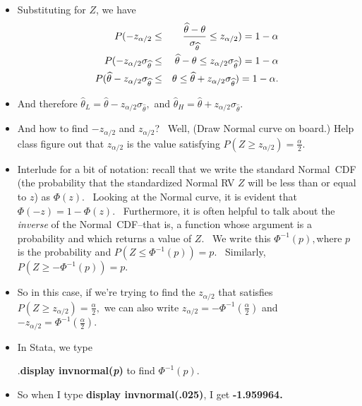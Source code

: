 \documentclass[11pt]{article}
\begin{document}
\begin{itemize}
\item Substituting for $Z$, we have%
\begin{eqnarray*}
P(-z_{\alpha /2} &\leq &\frac{\widehat{\theta }-\theta }{\sigma _{\widehat{%
\theta }}}\leq z_{\alpha /2})=1-\alpha \\
P(-z_{\alpha /2}\sigma _{\widehat{\theta }} &\leq &\widehat{\theta }-\theta
\leq z_{\alpha /2}\sigma _{\widehat{\theta }})=1-\alpha \\
P(\widehat{\theta }-z_{\alpha /2}\sigma _{\widehat{\theta }} &\leq &\theta
\leq \widehat{\theta }+z_{\alpha /2}\sigma _{\widehat{\theta }})=1-\alpha .
\end{eqnarray*}

\item And therefore $\widehat{\theta }_{L}=\widehat{\theta }-z_{\alpha
/2}\sigma _{\widehat{\theta }},$ and $\widehat{\theta }_{H}=\widehat{\theta }%
+z_{\alpha /2}\sigma _{\widehat{\theta }}.$

\item And how to find $-z_{\alpha /2}$ and $z_{\alpha /2}$? \ Well, (Draw
Normal curve on board.) Help class figure out that $z_{\alpha /2}$ is the
value satisfying $P(Z\geq z_{\alpha /2})=\frac{\alpha }{2}.$

\item Interlude for a bit of notation: recall that we write the standard
Normal\ CDF (the probability that the standardized Normal RV $Z$ will be
less than or equal to $z$) as $\Phi \left( z\right) .$ \ Looking at the
Normal curve, it is evident that $\Phi \left( -z\right) =1-\Phi \left(
z\right) .$ \ Furthermore, it is often helpful to talk about the \textit{%
inverse }of the Normal\ CDF--that is, a function whose argument is a
probability and which returns a value of $Z$. \ We write this $\Phi
^{-1}\left( p\right) ,$where $p$ is the probability and $P(Z\leq \Phi
^{-1}\left( p\right) )=p.$ \ Similarly, $P(Z\geq -\Phi ^{-1}\left( p\right)
)=p.$

\item So in this case, if we're trying to find the $z_{\alpha /2}$ that
satisfies $P(Z\geq z_{\alpha /2})=\frac{\alpha }{2},$ we can also write $%
z_{\alpha /2}=-\Phi ^{-1}\left( \frac{\alpha }{2}\right) $ and $-z_{\alpha
/2}=\Phi ^{-1}\left( \frac{\alpha }{2}\right) .$

\item In Stata, we type

$.$\textbf{display invnormal(\textit{p}) }to find $\Phi ^{-1}\left( p\right)
.$

\item So when I type \textbf{display invnormal(.025)}, I get \textbf{%
-1.959964. \ }


\end{itemize}
\end{document}
